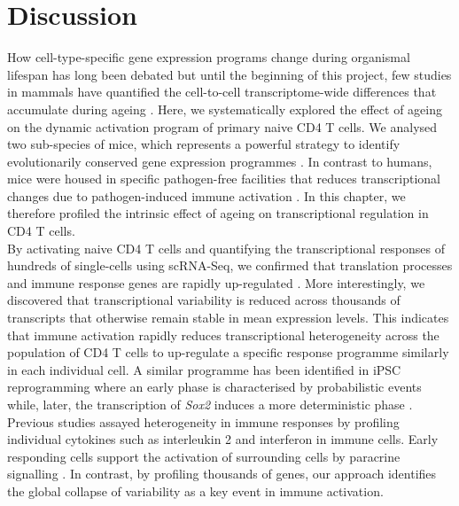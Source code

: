 
\section{Discussion}

How cell-type-specific gene expression programs change during organismal lifespan has long been debated \citep{Bahar2006, Warren2007} but until the beginning of this project, few studies in mammals have quantified the cell-to-cell transcriptome-wide differences that accumulate during ageing \citep{Kowalczyk2015}. Here, we systematically explored the effect of ageing on the dynamic activation program of primary naive CD4\plus{} T cells. We analysed two sub-species of mice, which represents a powerful strategy to identify evolutionarily conserved gene expression programmes \citep{Shay2013}. In contrast to humans, mice were housed in specific pathogen-free facilities that reduces transcriptional changes due to pathogen-induced immune activation \citep{Beura2016}. In this chapter, we therefore profiled the intrinsic effect of ageing on transcriptional regulation in CD4\plus{} T cells.\\

By activating naive CD4\plus{} T cells and quantifying the transcriptional responses of hundreds of single-cells using scRNA-Seq, we confirmed that translation processes and immune response genes are rapidly up-regulated \citep{Asmal2003, Neme2016, Turner2014, Glass2010, Gerondakis2010, Croft2009}. More interestingly, we discovered that transcriptional variability is reduced across thousands of transcripts that otherwise remain stable in mean expression levels. This indicates that immune activation rapidly reduces transcriptional heterogeneity across the population of CD4\plus{} T cells to up-regulate a specific response programme similarly in each individual cell. A similar programme has been identified in iPSC reprogramming where an early phase is characterised by probabilistic events while, later, the transcription of \textit{Sox2} induces a  more deterministic phase \citep{Buganim2012}. Previous studies assayed heterogeneity in immune responses by profiling individual cytokines such as interleukin 2 and interferon \textbeta{} in immune cells. Early responding cells support the activation of surrounding cells by paracrine signalling \citep{Fuhrmann2016, Shalek2014}. In contrast, by profiling thousands of genes, our approach identifies the global collapse of variability as a key event in immune activation.\\

